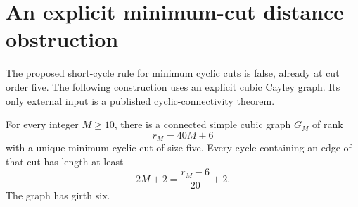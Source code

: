 \section{An explicit minimum-cut distance obstruction}
\label{sec:four-high-connectivity-long-cut}

The proposed short-cycle rule for minimum cyclic cuts is false, already at cut order five.
The following construction uses an explicit cubic Cayley graph.
Its only external input is a published cyclic-connectivity theorem.

\begin{proposition}
\label{prop:four-honeycomb-long-cut}
For every integer $M\ge10$, there is a connected simple cubic graph $G_M$ of rank
\[
 r_M=40M+6
\]
with a unique minimum cyclic cut of size five.
Every cycle containing an edge of that cut has length at least
\[
 2M+2=\frac{r_M-6}{20}+2.
\]
The graph has girth six.
\end{proposition}

